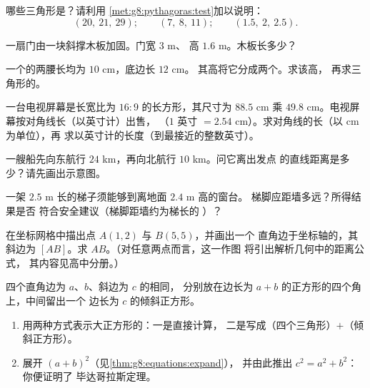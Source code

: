 \begin{exercise}[$\star$]\label{exo:g8:pythagoras:4}
哪些三角形是？请利用
\cref{met:g8:pythagoras:test}加以说明：
\[
(20,\ 21,\ 29); \qquad
(7,\ 8,\ 11); \qquad
(1.5,\ 2,\ 2.5).
\]
\end{exercise}

\begin{exercise}[$\star$]\label{exo:g8:pythagoras:5}
一扇门由一块斜撑木板加固。门宽 $3$ m、
高 $1.6$ m。木板长多少？
\end{exercise}

\begin{exercise}[$\star$]\label{exo:g8:pythagoras:6}
一个的两腰长均为 $10$ cm，底边长 $12$ cm。
其高将它分成两个。求该高，
再求三角形的。
\end{exercise}

\begin{exercise}[$\star\star$]\label{exo:g8:pythagoras:7}
一台电视屏幕是长宽比为 $16{:}9$ 的长方形，其尺寸为 $88.5$ cm 乘
$49.8$ cm。电视屏幕按对角线长（以英寸计）出售，
（$1$ 英寸 $= 2.54$ cm）。求对角线的长（以 cm 为单位），再
求以英寸计的长度（到最接近的整数英寸）。
\end{exercise}

\begin{exercise}[$\star\star$]\label{exo:g8:pythagoras:8}
一艘船先向东航行 $24$ km，再向北航行 $10$ km。问它离出发点
的直线距离是多少？请先画出示意图。
\end{exercise}

\begin{exercise}[$\star\star$]\label{exo:g8:pythagoras:9}
一架 $2.5$ m 长的梯子须能够到离地面 $2.4$ m 高的窗台。
梯脚应距墙多远？所得结果是否
符合安全建议（梯脚距墙约为梯长的
）？
\end{exercise}

\begin{exercise}[$\star\star$]\label{exo:g8:pythagoras:10}
在坐标网格中描出点 $A(1, 2)$ 与 $B(5, 5)$，并画出一个
直角边于坐标轴的，其斜边为
$[AB]$。求 $AB$。（对任意两点而言，这一作图
将引出解析几何中的距离公式，
其内容见高中分册。）
\end{exercise}

\begin{exercise}[$\star\star\star$]\label{exo:g8:pythagoras:11}
四个直角边为 $a$、$b$、斜边为 $c$ 的相同，
分别放在边长为 $a + b$ 的正方形的四个角上，中间留出一个
边长为 $c$ 的倾斜正方形。
\begin{enumerate}
  \item 用两种方式表示大正方形的：一是直接计算，
        二是写成（四个三角形）$+$（倾斜正方形）。
  \item 展开 $(a + b)^2$（见\cref{thm:g8:equations:expand}），
        并由此推出 $c^2 = a^2 + b^2$：你便证明了
        毕达哥拉斯定理。
\end{enumerate}
\end{exercise}

